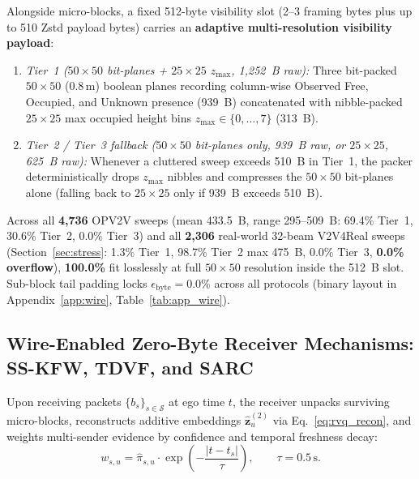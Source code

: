 \documentclass[journal]{IEEEtran}
\begin{document}
Alongside micro-blocks, a fixed 512-byte visibility slot (2--3 framing bytes plus up to 510 Zstd payload bytes) carries an \textbf{adaptive multi-resolution visibility payload}:
\begin{enumerate}
\item \textit{Tier~1 ($50\times 50$ bit-planes + $25\times 25$ $z_{\max}$, 1,252~B raw):} Three bit-packed $50\times 50$ ($0.8\,\mathrm{m}$) boolean planes recording column-wise Observed Free, Occupied, and Unknown presence (939~B) concatenated with nibble-packed $25\times 25$ max occupied height bins $z_{\max} \in \{0,\dots,7\}$ (313~B).
\item \textit{Tier~2 / Tier~3 fallback ($50\times 50$ bit-planes only, 939~B raw, or $25\times 25$, 625~B raw):} Whenever a cluttered sweep exceeds 510~B in Tier~1, the packer deterministically drops $z_{\max}$ nibbles and compresses the $50\times 50$ bit-planes alone (falling back to $25\times 25$ only if 939~B exceeds 510~B).
\end{enumerate}
Across all \textbf{4,736} OPV2V sweeps (mean 433.5~B, range 295--509~B: 69.4\% Tier~1, 30.6\% Tier~2, 0.0\% Tier~3) and all \textbf{2,306} real-world 32-beam V2V4Real sweeps (Section~\ref{sec:stress}: 1.3\% Tier~1, 98.7\% Tier~2 max 475~B, 0.0\% Tier~3, \textbf{0.0\% overflow}), \textbf{100.0\%} fit losslessly at full $50\times 50$ resolution inside the 512~B slot. Sub-block tail padding locks $\epsilon_{\mathrm{byte}} = 0.0\%$ across all protocols (binary layout in Appendix~\ref{app:wire}, Table~\ref{tab:app_wire}).

\subsection{Wire-Enabled Zero-Byte Receiver Mechanisms: SS-KFW, TDVF, and SARC}

Upon receiving packets $\{b_s\}_{s \in \mathcal{S}}$ at ego time $t$, the receiver unpacks surviving micro-blocks, reconstructs additive embeddings $\hat{\mathbf{z}}_u^{(2)}$ via Eq.~\eqref{eq:rvq_recon}, and weights multi-sender evidence by confidence and temporal freshness decay:
\begin{equation}
w_{s,u} = \hat{\pi}_{s,u} \cdot \exp\!\left(-\frac{|t - t_s|}{\tau}\right), \qquad \tau = 0.5\,\mathrm{s}.
\label{eq:age_weight}
\end{equation}
\end{document}
